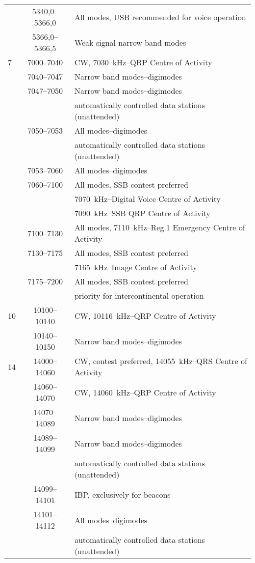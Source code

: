 \begin{xtabular}{lcl}
 & 5340,0--5366,0 & All modes, USB recommended for voice operation\\
 & 5366,0--5366,5 & Weak signal narrow band modes\\
%
7    & 7000--7040 & CW, 7030~kHz--QRP Centre of Activity\\
     & 7040--7047 & Narrow band modes--digimodes\\
     & 7047--7050 & Narrow band modes--digimodes\\
     & & automatically controlled data stations (unattended)\\
     & 7050--7053 & All modes--digimodes\\
     & & automatically controlled data stations (unattended)\\
     & 7053--7060 & All modes--digimodes\\
     & 7060--7100 & All modes, SSB contest preferred\\
     & & 7070~kHz--Digital Voice Centre of Activity\\
     & & 7090~kHz--SSB QRP Centre of Activity\\
     & 7100--7130 & All modes, 7110~kHz--Reg.1 Emergency Centre of Activity\\
     & 7130--7175 & All modes, SSB contest preferred\\
     & & 7165~kHz--Image Centre of Activity\\
     & 7175--7200 & All modes, SSB contest preferred\\
     & & priority for intercontinental operation\\
%
10   & 10100--10140 & CW, 10116~kHz--QRP Centre of Activity\\
     & 10140--10150 & Narrow band modes--digimodes\\
%
14   & 14000--14060 & CW, contest preferred, 14055~kHz--QRS Centre of Activity\\
     & 14060--14070 & CW, 14060~kHz--QRP Centre of Activity\\
     & 14070--14089 & Narrow band modes--digimodes\\
     & 14089--14099 & Narrow band modes--digimodes\\
     & & automatically controlled data stations (unattended)\\
     & 14099--14101 & IBP, exclusively for beacons\\
     & 14101--14112 & All modes--digimodes\\
     & & automatically controlled data stations (unattended)\\

\end{xtabular}
